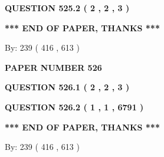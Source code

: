 \documentclass[12pt]{article}
\begin{document}
{\textbf{\Large{QUESTION
525.2 
 ( 2 , 2 , 3 )
}}}
  
  
   
   
 \vspace{0.2in}
 
   
   
   
   
\vspace{1.0in} 
{\textbf{\large{ *** END OF PAPER, THANKS *** }}} 
   
   
\hspace{1.0in} By: 
 239 ( 416 ,  613 )
   
   
   
   
\newpage 
\setcounter{page}{ 
   526001 } 
   
   
   
   
 {\textbf{ \Large{ PAPER NUMBER  526  }}}
   
   
\vspace{0.2in}
   
   
   
   
   
   
 \vspace{0.2in}
 
 
 
 
   
   
  
\vspace{0.2in}
  
{\textbf{\Large{QUESTION
526.1 
 ( 2 , 2 , 3 )
}}}
  
  
  
\vspace{0.2in}
  
{\textbf{\Large{QUESTION
526.2 
 ( 1 , 1 , 6791 )
}}}
  
  
   
   
 \vspace{0.2in}
 
   
   
   
   
\vspace{1.0in} 
{\textbf{\large{ *** END OF PAPER, THANKS *** }}} 
   
   
\hspace{1.0in} By: 
 239 ( 416 ,  613 )
   
   
   
   
\newpage 
\setcounter{page}{ 
   527001 } 
   
   
   
\end{document}
